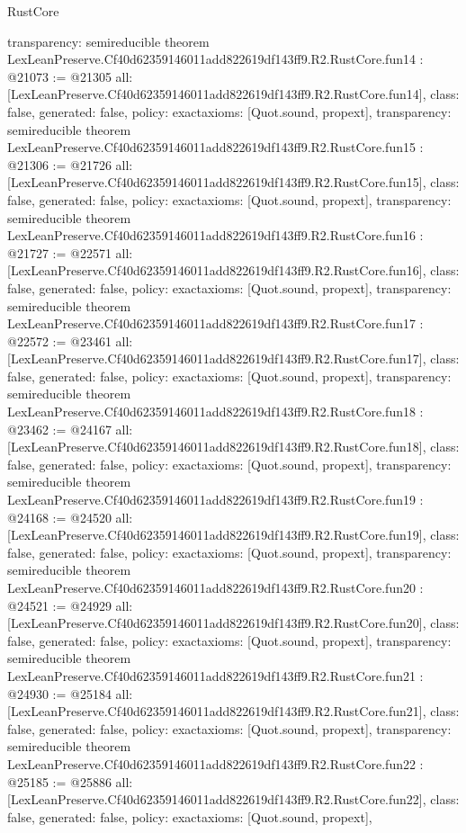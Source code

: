 \begin{lexlean}{RustCore}
\begin{coremodule}
{  transparency: semireducible
}
theorem LexLeanPreserve.Cf40d62359146011add822619df143ff9.R2.RustCore.fun14 : @21073 := @21305 {
  all: [LexLeanPreserve.Cf40d62359146011add822619df143ff9.R2.RustCore.fun14],
  class: false,
  generated: false,
  policy: exact{axioms: [Quot.sound, propext]},
  transparency: semireducible
}
theorem LexLeanPreserve.Cf40d62359146011add822619df143ff9.R2.RustCore.fun15 : @21306 := @21726 {
  all: [LexLeanPreserve.Cf40d62359146011add822619df143ff9.R2.RustCore.fun15],
  class: false,
  generated: false,
  policy: exact{axioms: [Quot.sound, propext]},
  transparency: semireducible
}
theorem LexLeanPreserve.Cf40d62359146011add822619df143ff9.R2.RustCore.fun16 : @21727 := @22571 {
  all: [LexLeanPreserve.Cf40d62359146011add822619df143ff9.R2.RustCore.fun16],
  class: false,
  generated: false,
  policy: exact{axioms: [Quot.sound, propext]},
  transparency: semireducible
}
theorem LexLeanPreserve.Cf40d62359146011add822619df143ff9.R2.RustCore.fun17 : @22572 := @23461 {
  all: [LexLeanPreserve.Cf40d62359146011add822619df143ff9.R2.RustCore.fun17],
  class: false,
  generated: false,
  policy: exact{axioms: [Quot.sound, propext]},
  transparency: semireducible
}
theorem LexLeanPreserve.Cf40d62359146011add822619df143ff9.R2.RustCore.fun18 : @23462 := @24167 {
  all: [LexLeanPreserve.Cf40d62359146011add822619df143ff9.R2.RustCore.fun18],
  class: false,
  generated: false,
  policy: exact{axioms: [Quot.sound, propext]},
  transparency: semireducible
}
theorem LexLeanPreserve.Cf40d62359146011add822619df143ff9.R2.RustCore.fun19 : @24168 := @24520 {
  all: [LexLeanPreserve.Cf40d62359146011add822619df143ff9.R2.RustCore.fun19],
  class: false,
  generated: false,
  policy: exact{axioms: [Quot.sound, propext]},
  transparency: semireducible
}
theorem LexLeanPreserve.Cf40d62359146011add822619df143ff9.R2.RustCore.fun20 : @24521 := @24929 {
  all: [LexLeanPreserve.Cf40d62359146011add822619df143ff9.R2.RustCore.fun20],
  class: false,
  generated: false,
  policy: exact{axioms: [Quot.sound, propext]},
  transparency: semireducible
}
theorem LexLeanPreserve.Cf40d62359146011add822619df143ff9.R2.RustCore.fun21 : @24930 := @25184 {
  all: [LexLeanPreserve.Cf40d62359146011add822619df143ff9.R2.RustCore.fun21],
  class: false,
  generated: false,
  policy: exact{axioms: [Quot.sound, propext]},
  transparency: semireducible
}
theorem LexLeanPreserve.Cf40d62359146011add822619df143ff9.R2.RustCore.fun22 : @25185 := @25886 {
  all: [LexLeanPreserve.Cf40d62359146011add822619df143ff9.R2.RustCore.fun22],
  class: false,
  generated: false,
  policy: exact{axioms: [Quot.sound, propext]},
}
\end{coremodule}
\end{lexlean}
